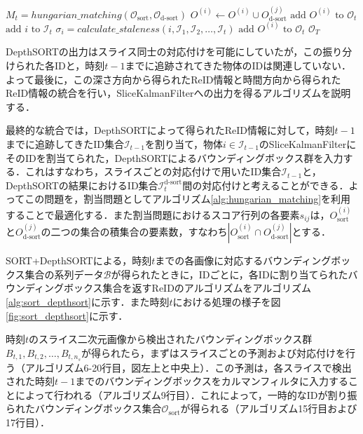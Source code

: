 \begin{algorithm}[t]
\begin{algorithmic}[1]
                    \State $M_t = hungarian\_matching(\mathcal{O}_{\text{sort}}, \mathcal{O}_{\text{d-sort}})$
                        \State $O^{(i)} \gets O^{(i)} \cup O_{\text{d-sort}}^{(j)}$
                        \State $\text{add } O^{(i)} \text{ to } \mathcal{O}_t $
                        \State $\text{add } i \text{ to } \mathcal{I}_t$
                    \EndFor
                        \State $\sigma_i = calculate\_staleness(i, \mathcal{I}_1, \mathcal{I}_2, \dots, \mathcal{I}_t)$
                            \State $\text{add } O^{(i)} \text{ to } \mathcal{O}_t$
                        \EndIf
                    \EndFor
                \EndFor
                \State \Return $\mathcal{O}_T$
            \end{algorithmic}
        \end{algorithm}

        DepthSORTの出力はスライス同士の対応付けを可能にしていたが，この振り分けられた各IDと，時刻$t-1$までに追跡されてきた物体のIDは関連していない．よって最後に，この深さ方向から得られたReID情報と時間方向から得られたReID情報の統合を行い，SliceKalmanFilterへの出力を得るアルゴリズムを説明する．

        最終的な統合では，DepthSORTによって得られたReID情報に対して，時刻$t-1$までに追跡してきたID集合$\mathcal{I}_{t-1}$を割り当て，物体$i \in \mathcal{I}_{t-1}$のSliceKalmanFilterにそのIDを割当てられた，DepthSORTによるバウンディングボックス群を入力する．これはすなわち，スライスごとの対応付けで用いたID集合$\mathcal{I}_{t-1}$と，DepthSORTの結果におけるID集合$\mathcal{I}_t^{\text{d-sort}}$間の対応付けと考えることができる．よってこの問題を，割当問題としてアルゴリズム\ref{alg:hungarian_matching}を利用することで最適化する．また割当問題におけるスコア行列の各要素$s_{ij}$は，$O_{\text{sort}}^{(i)}$と$O_{\text{d-sort}}^{(j)}$の二つの集合の積集合の要素数，すなわち$\left| O_{\text{sort}}^{(i)}\cap O_{\text{d-sort}}^{(j)}\right|$とする．

        SORT+DepthSORTによる，時刻$t$までの各画像に対応するバウンディングボックス集合の系列データ$\mathcal{B}$が得られたときに，IDごとに，各IDに割り当てられたバウンディングボックス集合を返すReIDのアルゴリズムをアルゴリズム\ref{alg:sort_depthsort}に示す．また時刻$t$における処理の様子を図\ref{fig:sort_depthsort}に示す．

        時刻$t$のスライス二次元画像から検出されたバウンディングボックス群$B_{t, 1}, B_{t, 2}, \dots, B_{t, n_s}$が得られたら，まずはスライスごとの予測および対応付けを行う（アルゴリズム6-20行目，図左上と中央上）．この予測は，各スライスで検出された時刻$t-1$までのバウンディングボックスをカルマンフィルタに入力することによって行われる（アルゴリズム9行目）．これによって，一時的なIDが割り振られたバウンディングボックス集合$\mathcal{O}_{\text{sort}}$が得られる（アルゴリズム15行目および17行目）．

